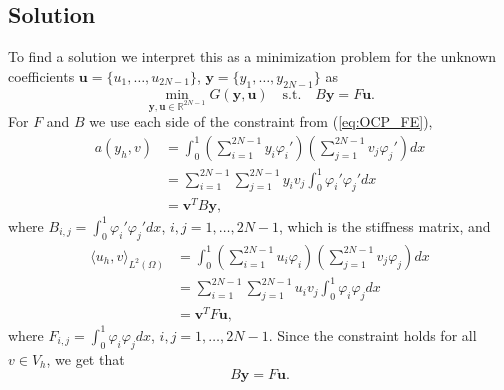 \subsection{Solution}
To find a solution we interpret this as a minimization problem for the unknown coefficients $\mathbf{u} = \{u_1, \dots, u_{2N-1} \}$, $\mathbf{y} = \{y_1, \dots, y_{2N-1} \}$ as
\begin{equation}
    \label{eq:OCP_coeff}
    \min_{\mathbf{y,u} \in \mathds{R}^{2N-1}} G(\mathbf{y, u}) \quad \text{s.t.} \quad B\mathbf{y} = F\mathbf{u}.
\end{equation}
For $F$ and $B$ we use each side of the constraint from (\ref{eq:OCP_FE}), 
\begin{align*}
    a(y_h, v) &= \int_0^1 \left( \sum_{i=1}^{2N-1} y_i \varphi_i'  \right) \left( \sum_{j=1}^{2N-1} v_j \varphi_j'\right)dx  \\
    & = \sum_{i=1}^{2N-1}\sum_{j=1}^{2N-1} y_i v_j\int_0^1  \varphi_i' \varphi_j' dx \\
    &= \mathbf{v}^T B \mathbf{y} ,
\end{align*}
where $B_{i,j} = \int_0^1 \varphi_i' \varphi_j'dx$,  $i,j = 1, \dots, 2N-1$, which is the stiffness matrix, and  
\begin{align*}
    \langle u_h, v \rangle_{L^2(\Omega)} &= \int_0^1 \left( \sum_{i=1}^{2N-1} u_i \varphi_i \right) \left( \sum_{j=1}^{2N-1} v_j \varphi_j \right) dx \\
    &= \sum_{i=1}^{2N-1}\sum_{j=1}^{2N-1} u_i v_j\int_0^1  \varphi_i \varphi_j dx \\
    &= \mathbf{v}^T F \mathbf{u} , 
\end{align*}
 where $F_{i,j}=\int_0^1  \varphi_i \varphi_j dx$, $i,j = 1, \dots, 2N-1$.
Since the constraint holds for all $v \in V_h$, we get that
$$B\mathbf{y} = F \mathbf{u}.$$


